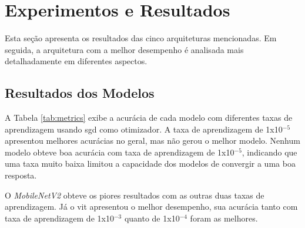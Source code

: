 \chapter{Experimentos e Resultados}\label{cap:resultados}
Esta seção apresenta os resultados das cinco arquiteturas mencionadas. 
Em seguida, a arquitetura com a melhor desempenho é analisada mais detalhadamente em diferentes aspectos.
\section{Resultados dos Modelos}\label{sec:modelsresults}


A Tabela \ref{tab:metrics} exibe a acurácia de cada modelo com diferentes taxas de aprendizagem usando \acrshort{sgd} como otimizador.
A taxa de aprendizagem de 1x10$^{-5}$ apresentou melhores acurácias no geral, mas não gerou o melhor modelo.
Nenhum modelo obteve boa acurácia com taxa de aprendizagem de 1x10$^{-5}$, indicando que uma taxa muito baixa limitou a capacidade dos modelos de convergir a uma boa resposta.

O \textit{MobileNetV2} obteve os piores resultados com as outras duas taxas de aprendizagem.
Já o \acrshort{vit} apresentou o melhor desempenho, sua acurácia tanto com taxa de aprendizagem de 1x10$^{-3}$ quanto de 1x10$^{-4}$ foram as melhores.

